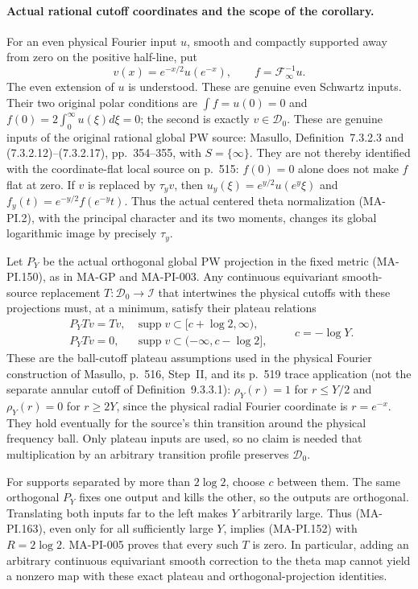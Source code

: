 \paragraph{Actual rational cutoff coordinates and the scope of the corollary.}
For an even physical Fourier input $u$, smooth and compactly
supported away from zero on the positive half-line, put
\[
 v(x)=e^{-x/2}u(e^{-x}),\qquad f=\mathcal F_\infty^{-1}u.
 \tag{MA-PI.162}
\]
The even extension of $u$ is understood.  These are genuine
even Schwartz inputs.  Their two original polar conditions
are $\int f=u(0)=0$ and
$f(0)=2\int_0^\infty u(\xi)d\xi=0$; the second is
exactly $v\in\mathcal D_0$.
These are genuine inputs of the original rational global
PW source: Masullo, Definition~7.3.2.3 and (7.3.2.12)--(7.3.2.17),
pp.~354--355, with $S=\{\infty\}$.  They are not thereby
identified with the coordinate-flat local source on p.~515:
$f(0)=0$ alone does not make $f$ flat at zero.
If $v$ is replaced by $\tau_yv$, then
$u_y(\xi)=e^{y/2}u(e^y\xi)$ and
$f_y(t)=e^{-y/2}f(e^{-y}t)$.  Thus the actual centered
theta normalization (MA-PI.2), with the principal
character and its two moments, changes its global
logarithmic image by precisely $\tau_y$.

Let $P_Y$ be the actual orthogonal global PW projection
in the fixed metric (MA-PI.150), as in MA-GP and MA-PI-003.
Any continuous equivariant smooth-source replacement
$T:\mathcal D_0\to\mathscr I$ that intertwines the
physical cutoffs with these projections must, at a minimum,
satisfy their plateau relations
\[
 \begin{array}{ll}
 P_YTv=Tv,&\operatorname{supp}v\subset[c+\log2,\infty),\\
 P_YTv=0,&\operatorname{supp}v\subset(-\infty,c-\log2],
 \end{array}
 \qquad c=-\log Y.
 \tag{MA-PI.163}
\]
These are the ball-cutoff plateau assumptions used in the
physical Fourier construction of Masullo, p.~516, Step~II,
and its p.~519 trace application (not the separate annular
cutoff of Definition~9.3.3.1):
$\rho_Y(r)=1$ for $r\le Y/2$ and $\rho_Y(r)=0$ for
$r\ge2Y$, since the physical radial Fourier coordinate
is $r=e^{-x}$.  They hold eventually for the source's
thin transition around the physical frequency ball.
Only plateau inputs are used, so no
claim is needed that multiplication by an arbitrary
transition profile preserves $\mathcal D_0$.

For supports separated by more than $2\log2$, choose
$c$ between them.  The same orthogonal $P_Y$ fixes
one output and kills the other, so the outputs are
orthogonal.  Translating both inputs far to the left
makes $Y$ arbitrarily large.  Thus (MA-PI.163), even
only for all sufficiently large $Y$, implies
(MA-PI.152) with $R=2\log2$.
MA-PI-005 proves that every such $T$ is zero.
In particular, adding an arbitrary continuous
equivariant smooth correction to the theta map
cannot yield a nonzero map with these exact plateau
and orthogonal-projection identities.

